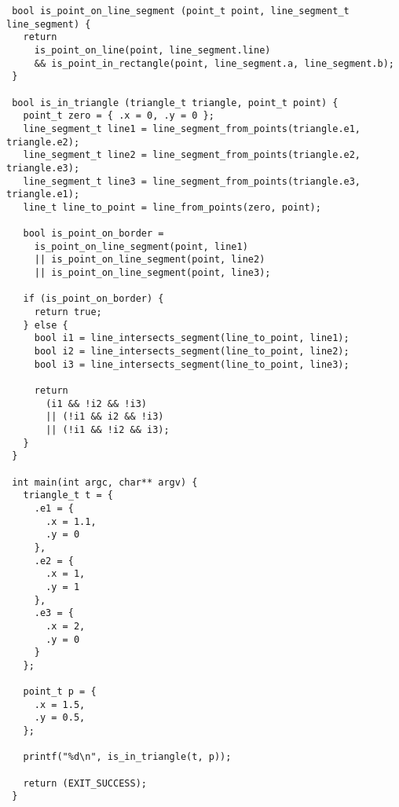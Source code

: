 \documentclass[a4paper,10pt]{article}
\begin{document}
\begin{lstlisting}
 bool is_point_on_line_segment (point_t point, line_segment_t line_segment) {
   return
     is_point_on_line(point, line_segment.line)
     && is_point_in_rectangle(point, line_segment.a, line_segment.b);
 }

 bool is_in_triangle (triangle_t triangle, point_t point) {
   point_t zero = { .x = 0, .y = 0 };
   line_segment_t line1 = line_segment_from_points(triangle.e1, triangle.e2);
   line_segment_t line2 = line_segment_from_points(triangle.e2, triangle.e3);
   line_segment_t line3 = line_segment_from_points(triangle.e3, triangle.e1);
   line_t line_to_point = line_from_points(zero, point);
  
   bool is_point_on_border = 
     is_point_on_line_segment(point, line1)
     || is_point_on_line_segment(point, line2)
     || is_point_on_line_segment(point, line3);
  
   if (is_point_on_border) {
     return true;
   } else {
     bool i1 = line_intersects_segment(line_to_point, line1);
     bool i2 = line_intersects_segment(line_to_point, line2);
     bool i3 = line_intersects_segment(line_to_point, line3);

     return
       (i1 && !i2 && !i3)
       || (!i1 && i2 && !i3)
       || (!i1 && !i2 && i3);
   }
 }

 int main(int argc, char** argv) {
   triangle_t t = {
     .e1 = {
       .x = 1.1,
       .y = 0
     },
     .e2 = {
       .x = 1,
       .y = 1
     },
     .e3 = {
       .x = 2,
       .y = 0
     }
   };
  
   point_t p = {
     .x = 1.5,
     .y = 0.5,
   };
  
   printf("%d\n", is_in_triangle(t, p));

   return (EXIT_SUCCESS);
 }
\end{lstlisting}
\end{document}
